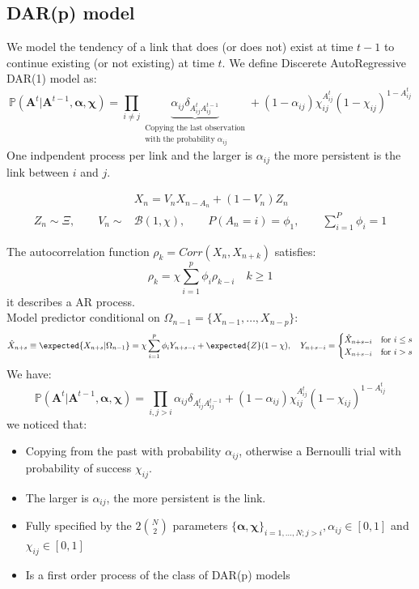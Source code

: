 \subsection{DAR(p) model}
We model the tendency of a link that does (or does not) exist at time $t-1$ to continue existing (or not existing) at time $t$. We define Discerete AutoRegressive DAR(1) model as:
\[
\mathbb{P}(\mathbf{A}^t | \mathbf{A}^{t-1}, \bm{\alpha},\bm{\chi}) = \prod_{i\neq j} \underbrace{\alpha_{ij}\delta_{A^t_{ij}A_{ij}^{t-1}}}_{\substack{\text{Copying the last observation} \\ \text{with the probability }\alpha_{ij}}} + (1-\alpha_{ij})\chi_{ij}^{A_{ij}^t} (1 - \chi_{ij})^{1 - A_{ij}^t}
\]
One indpendent process per link and the larger is $\alpha_{ij}$ the more persistent is the link between $i$ and $j$.
\begin{mydefinition}
	\begin{align*}
		&X_n = V_n X_{n-A_n}  + (1-V_n)Z_n\\
		Z_n \sim  \Xi, \qquad V_n \sim &\mathcal{B}(1,\chi), \qquad P(A_n = i) = \phi_1, \qquad \sum_{i=1}^P \phi_i = 1
	\end{align*}
\end{mydefinition}
The autocorrelation function $\rho_k = Corr(X_n, X_{n+k})$ satisfies:
\[
\rho_k = \chi \sum_{i =1}^p \phi_i \rho_{k-i} \quad k\geq 1
\]
it describes a AR process.\\
Model predictor conditional on $\Omega_{n-1} = \{ X_{n-1},\ldots, X_{n-p}\}$:
\[
\hat{X}_{n+s} \equiv \expected{X_{n+s}| \Omega_{n-1}} = \chi \sum_{i=1}^{p}\phi_iY_{n+s-i} + \expected{Z}(1- \chi), \quad Y_{n+s-i} = \begin{cases}
	\hat{X}_{n+s-i} & \text{for }i\leq s\\
	 X_{n+s-i} & \text{for }i> s\\
\end{cases}
\]
We have:
\[
\mathbb{P}(\mathbf{A}^t | \mathbf{A}^{t-1}, \bm{\alpha},\bm{\chi}) = \prod_{i,j>i} \alpha_{ij}\delta_{A^t_{ij}A_{ij}^{t-1}} + (1-\alpha_{ij})\chi_{ij}^{A_{ij}^t} (1 - \chi_{ij})^{1 - A_{ij}^t}
\]
we noticed that:
\begin{itemize}
	\item Copying from the past with probability $\alpha_{ij}$, otherwise a Bernoulli trial with probability of success $\chi_{ij}$.
	\item The larger is $\alpha_{ij}$, the more persistent is the link.
	\item Fully specified by the $2 {N \choose 2}$ parameters $\{\bm{\alpha}, \bm{\chi}\}_{i=1,\ldots,N;j > i}, \alpha_{ij} \in [0,1]$ and $\chi_{ij} \in [0,1]$
	\item Is a first order process of the class of DAR(p) models
\end{itemize}

